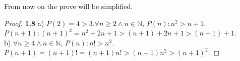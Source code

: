 \documentclass{article}
\begin{document}
From now on the prove will be simplified.
\begin{proof}
\textbf{1.8} a) $P(2) = 4 > 3$.$\forall n \geq 2 \wedge n \in \mathbb{N}$, $P(n): n^2 > n + 1$.
\\ $P(n+1): (n+1)^2 = n^2 + 2n + 1 > (n+1) + 2n + 1 > (n+1) + 1$.
\\ b) $\forall n \geq 4 \wedge n \in \mathbb{N}$, $P(n): n! > n^2$. $P(n+1) = (n+1)! = (n+1)n! > (n+1)n^2> (n+1)^2$.
\end{proof}
\end{document}
